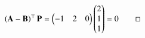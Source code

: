 		\begin{align}
			\brak{\vec{A}-\vec{B}}^\top\vec{P}=
			\myvec{-1&2&0}\myvec{2\\1\\1}=0 \qed
		\end{align}
